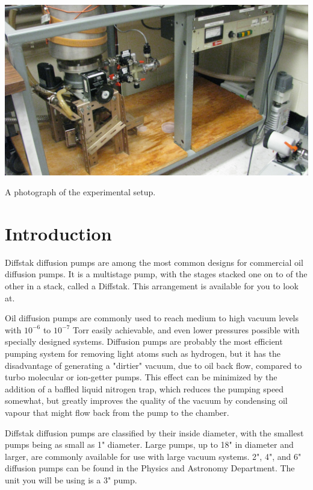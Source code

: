 \begin{marginfigure}
\includegraphics{diffstak.jpg}
\caption{A photograph of the experimental setup.}
\label{fig:VACsetup7}
\end{marginfigure}

\section{Introduction}

Diffstak diffusion pumps are among the most common designs for commercial oil diffusion pumps. It is a multistage pump, with the stages stacked one on to of the other in a stack, called a Diffstak. This arrangement is available for you to look at.

Oil diffusion pumps are commonly used to reach medium to high vacuum levels with  $10^{-6}$ to $10^{-7}$ Torr easily achievable, and even lower pressures possible with specially designed systems. Diffusion pumps are probably the most efficient pumping system for removing light atoms such as hydrogen, but it has the disadvantage of generating a "dirtier" vacuum, due to oil back flow, compared to turbo molecular or ion-getter pumps. This effect can be minimized by the addition of a baffled liquid nitrogen trap, which reduces the pumping speed somewhat, but greatly improves the quality of the vacuum by condensing oil vapour that might flow back from the pump to the chamber.

Diffstak diffusion pumps are classified by their inside diameter, with the smallest pumps being as small as 1" diameter. Large pumps, up to 18" in diameter and larger, are commonly available for use with large vacuum systems.  2", 4", and 6" diffusion pumps can be found in the Physics and Astronomy Department. The unit you will be using is a 3" pump.

